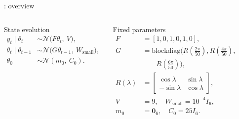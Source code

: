 \begin{frame}{\casetitleprefix: overview}
\begin{columns}[T,onlytextwidth]
  \begin{whiteblock}{\small State evolution}
    \scriptsize
    \[
    \begin{aligned}
      y_t \mid \theta_t &\sim \mathcal{N}\!\big(F\theta_t,\ V\big),\\
      \theta_t \mid \theta_{t-1} &\sim \mathcal{N}\!\big(G\theta_{t-1},\ W_{\text{small}}\big),\\
      \theta_0 &\sim \mathcal{N}(m_0,\ C_0).
    \end{aligned}
    \]
  \end{whiteblock}
  \begin{whiteblock}{\small Fixed parameters}
    \scriptsize
    \[
    \begin{aligned}
      F &= [1,0,1,0,1,0],\\
      G &= \mathrm{blockdiag}\!\big(R(\tfrac{2\pi}{50}),R(\tfrac{4\pi}{50}),\\
      &\qquad R(\tfrac{6\pi}{50})\big),\\
      R(\lambda) &= \begin{bmatrix}\cos\lambda&\sin\lambda\\ -\sin\lambda&\cos\lambda\end{bmatrix},\\
      V &= 9,\quad W_{\text{small}}=10^{-4} I_6,\\
      m_0 &= \mathbf{0}_6,\quad C_0=25I_6.
    \end{aligned}
    \]
  \end{whiteblock}
\end{columns}
\end{frame}
